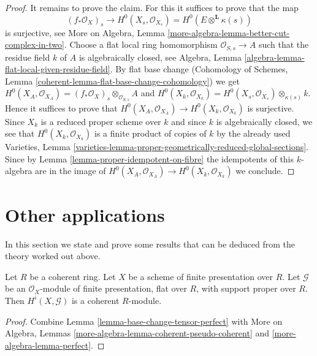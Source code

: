 \begin{proof}
\medskip\noindent
It remains to prove the claim. For this it suffices to prove that the map
$$
(f_*\mathcal{O}_X)_s
\longrightarrow
H^0(X_s, \mathcal{O}_{X_s}) = H^0(E \otimes^\mathbf{L} \kappa(s))
$$
is surjective, see
More on Algebra, Lemma \ref{more-algebra-lemma-better-cut-complex-in-two}.
Choose a flat local ring homomorphism $\mathcal{O}_{S, s} \to A$
such that the residue field $k$ of $A$ is algebraically closed, see
Algebra, Lemma \ref{algebra-lemma-flat-local-given-residue-field}.
By flat base change (Cohomology of Schemes, Lemma
\ref{coherent-lemma-flat-base-change-cohomology})
we get $H^0(X_A, \mathcal{O}_{X_A}) =
(f_*\mathcal{O}_X)_s \otimes_{\mathcal{O}_{S, s}} A$
and $H^0(X_k, \mathcal{O}_{X_k}) =
H^0(X_s, \mathcal{O}_{X_s}) \otimes_{\kappa(s)} k$.
Hence it suffices to prove that
$H^0(X_A, \mathcal{O}_{X_A}) \to H^0(X_k, \mathcal{O}_{X_k})$
is surjective. Since $X_k$ is a reduced proper scheme over $k$
and since $k$ is algebraically closed, we see that
$H^0(X_k, \mathcal{O}_{X_k})$ is a finite product of copies
of $k$ by the already used Varieties, Lemma
\ref{varieties-lemma-proper-geometrically-reduced-global-sections}.
Since by Lemma \ref{lemma-proper-idempotent-on-fibre}
the idempotents of this $k$-algebra are in the image
of $H^0(X_A, \mathcal{O}_{X_A}) \to H^0(X_k, \mathcal{O}_{X_k})$ we conclude.
\end{proof}





\section{Other applications}
\label{section-other-applications}

\noindent
In this section we state and prove some results that can be deduced
from the theory worked out above.

\begin{lemma}
\label{lemma-cohomology-over-coherent-ring}
Let $R$ be a coherent ring. Let $X$ be a scheme of finite presentation over $R$.
Let $\mathcal{G}$ be an $\mathcal{O}_X$-module of finite presentation,
flat over $R$, with support proper over $R$. Then
$H^i(X, \mathcal{G})$ is a coherent $R$-module.
\end{lemma}

\begin{proof}
Combine Lemma \ref{lemma-base-change-tensor-perfect} with
More on Algebra, Lemmas \ref{more-algebra-lemma-coherent-pseudo-coherent} and
\ref{more-algebra-lemma-perfect}.
\end{proof}

